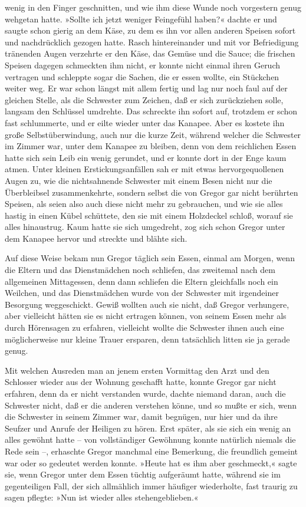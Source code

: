 wenig in den Finger geschnitten, und wie ihm diese Wunde noch vorgestern
genug wehgetan hatte. »Sollte ich jetzt weniger Feingefühl haben?«
dachte er und saugte schon gierig an dem Käse, zu dem es ihn vor allen
anderen Speisen sofort und nachdrücklich gezogen hatte. Rasch
hintereinander und mit vor Befriedigung tränenden Augen verzehrte er den
Käse, das Gemüse und die Sauce; die frischen Speisen dagegen schmeckten
ihm nicht, er konnte nicht einmal ihren Geruch vertragen und schleppte
sogar die Sachen, die er essen wollte, ein Stückchen weiter weg. Er war
schon längst mit allem fertig und lag nur noch faul auf der gleichen
Stelle, als die Schwester zum Zeichen, daß er sich zurückziehen solle,
langsam den Schlüssel umdrehte. Das schreckte ihn sofort auf, trotzdem
er schon fast schlummerte, und er eilte wieder unter das Kanapee. Aber
es kostete ihn große Selbstüberwindung, auch nur die kurze Zeit, während
welcher die Schwester im Zimmer war, unter dem Kanapee zu bleiben, denn
von dem reichlichen Essen hatte sich sein Leib ein wenig gerundet, und
er konnte dort in der Enge kaum atmen. Unter kleinen Erstickungsanfällen
sah er mit etwas hervorgequollenen Augen zu, wie die nichtsahnende
Schwester mit einem Besen nicht nur die Überbleibsel zusammenkehrte,
sondern selbst die von Gregor gar nicht berührten Speisen, als seien
also auch diese nicht mehr zu gebrauchen, und wie sie alles hastig in
einen Kübel schüttete, den sie mit einem Holzdeckel schloß, worauf sie
alles hinaustrug. Kaum hatte sie sich umgedreht, zog sich schon Gregor
unter dem Kanapee hervor und streckte und blähte sich.

Auf diese Weise bekam nun Gregor täglich sein Essen, einmal am Morgen,
wenn die Eltern und das Dienstmädchen noch schliefen, das zweitemal nach
dem allgemeinen Mittagessen, denn dann schliefen die Eltern gleichfalls
noch ein Weilchen, und das Dienstmädchen wurde von der Schwester mit
irgendeiner Besorgung weggeschickt. Gewiß wollten auch sie nicht, daß
Gregor verhungere, aber vielleicht hätten sie es nicht ertragen können,
von seinem Essen mehr als durch Hörensagen zu erfahren, vielleicht
wollte die Schwester ihnen auch eine möglicherweise nur kleine Trauer
ersparen, denn tatsächlich litten sie ja gerade genug.

Mit welchen Ausreden man an jenem ersten Vormittag den Arzt und den
Schlosser wieder aus der Wohnung geschafft hatte, konnte Gregor gar
nicht erfahren, denn da er nicht verstanden wurde, dachte niemand daran,
auch die Schwester nicht, daß er die anderen verstehen könne, und so
mußte er sich, wenn die Schwester in seinem Zimmer war, damit begnügen,
nur hier und da ihre Seufzer und Anrufe der Heiligen zu hören. Erst
später, als sie sich ein wenig an alles gewöhnt hatte -- von
vollständiger Gewöhnung konnte natürlich niemals die Rede sein --,
erhaschte Gregor manchmal eine Bemerkung, die freundlich gemeint war
oder so gedeutet werden konnte. »Heute hat es ihm aber geschmeckt,«
sagte sie, wenn Gregor unter dem Essen tüchtig aufgeräumt hatte, während
sie im gegenteiligen Fall, der sich allmählich immer häufiger
wiederholte, fast traurig zu sagen pflegte: »Nun ist wieder alles
stehengeblieben.«

